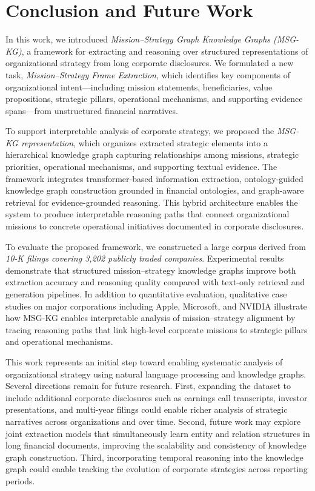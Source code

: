 \documentclass[11pt]{article}
\begin{document}
\section{Conclusion and Future Work}

In this work, we introduced \textit{Mission--Strategy Graph Knowledge Graphs (MSG-KG)}, a framework for extracting and reasoning over structured representations of organizational strategy from long corporate disclosures. We formulated a new task, \textit{Mission--Strategy Frame Extraction}, which identifies key components of organizational intent---including mission statements, beneficiaries, value propositions, strategic pillars, operational mechanisms, and supporting evidence spans---from unstructured financial narratives.

To support interpretable analysis of corporate strategy, we proposed the \textit{MSG-KG representation}, which organizes extracted strategic elements into a hierarchical knowledge graph capturing relationships among missions, strategic priorities, operational mechanisms, and supporting textual evidence. The framework integrates transformer-based information extraction, ontology-guided knowledge graph construction grounded in financial ontologies, and graph-aware retrieval for evidence-grounded reasoning. This hybrid architecture enables the system to produce interpretable reasoning paths that connect organizational missions to concrete operational initiatives documented in corporate disclosures.

To evaluate the proposed framework, we constructed a large corpus derived from \textit{10-K filings covering 3,202 publicly traded companies}. Experimental results demonstrate that structured mission--strategy knowledge graphs improve both extraction accuracy and reasoning quality compared with text-only retrieval and generation pipelines. In addition to quantitative evaluation, qualitative case studies on major corporations including Apple, Microsoft, and NVIDIA illustrate how MSG-KG enables interpretable analysis of mission--strategy alignment by tracing reasoning paths that link high-level corporate missions to strategic pillars and operational mechanisms.

This work represents an initial step toward enabling systematic analysis of organizational strategy using natural language processing and knowledge graphs. Several directions remain for future research. First, expanding the dataset to include additional corporate disclosures such as earnings call transcripts, investor presentations, and multi-year filings could enable richer analysis of strategic narratives across organizations and over time. Second, future work may explore joint extraction models that simultaneously learn entity and relation structures in long financial documents, improving the scalability and consistency of knowledge graph construction. Third, incorporating temporal reasoning into the knowledge graph could enable tracking the evolution of corporate strategies across reporting periods.
\end{document}
